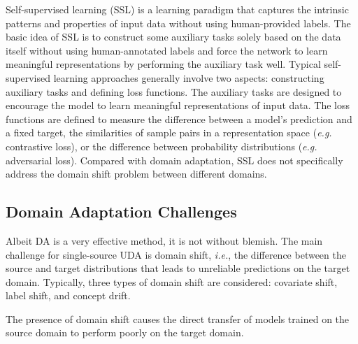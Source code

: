 \documentclass[conference]{IEEEtran}
\begin{document}
Self-supervised learning (SSL) is a learning paradigm that captures the intrinsic patterns
and properties of input data without using human-provided labels.
The basic idea of SSL is to construct some auxiliary tasks solely based on the data itself
without using human-annotated labels and force the network to learn meaningful representations
by performing the auxiliary task well. 
Typical self-supervised learning approaches generally involve two aspects: constructing
auxiliary tasks and defining loss functions.
The auxiliary tasks are designed to encourage the model to learn meaningful representations
of input data. 
The loss functions are defined to measure the difference between a model's prediction
and a fixed target, the similarities of sample pairs in a representation space (\textit{e.g.} contrastive loss),
or the difference between probability distributions (\textit{e.g.} adversarial loss).
Compared with domain adaptation, SSL does not specifically address the domain shift problem
between different domains.

\subsection{Domain Adaptation Challenges}
Albeit DA is a very effective method, it is not without blemish.
The main challenge for single-source UDA is domain shift, \textit{i.e.},
the difference between the source and target distributions that leads to 
unreliable predictions on the target domain. 
Typically, three types of domain shift are considered: covariate shift, 
label shift, and concept drift.

The presence of domain shift causes the direct transfer of models trained 
on the source domain to perform poorly on the target domain. 
\end{document}
